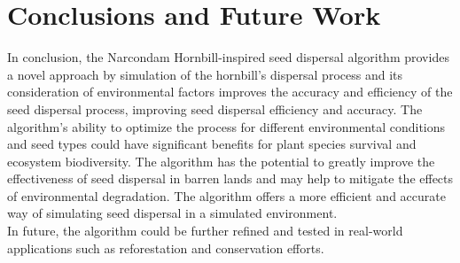 \documentclass[pmlr,twocolumn,10pt]{jmlr}
\begin{document}
\section{Conclusions and Future Work}
In conclusion, the Narcondam Hornbill-inspired seed dispersal algorithm provides a novel approach by simulation of the hornbill's dispersal process and its consideration of environmental factors improves the accuracy and efficiency of the seed dispersal process, improving seed dispersal efficiency and accuracy. The algorithm's ability to optimize the process for different environmental conditions and seed types could have significant benefits for plant species survival and ecosystem biodiversity. The algorithm has the potential to greatly improve the effectiveness of seed dispersal in barren lands and may help to mitigate the effects of environmental degradation. The algorithm offers a more efficient and accurate way of simulating seed dispersal in a simulated environment. 
\\In future, the algorithm could be further refined and tested in real-world applications such as reforestation and conservation efforts.
\end{document}
